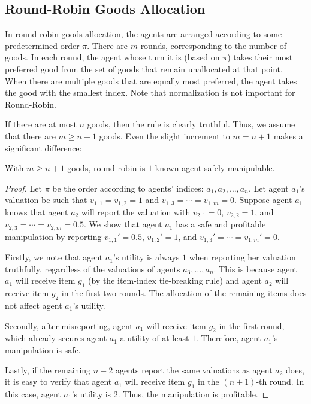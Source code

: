 \subsection{Round-Robin Goods Allocation}
In round-robin goods allocation, the agents are arranged according to some predetermined order $\pi$. 
There are $m$ rounds, corresponding to the number of goods. 
In each round, the agent whose turn it is (based on $\pi$) takes their most preferred good from the set of goods that remain unallocated at that point.
When there are multiple goods that are equally most preferred, the agent takes the good with the smallest index.
Note that normalization is not important for Round-Robin.

If there are at most $n$ goods, then the rule is clearly truthful.
Thus, we assume that there are $m\geq n+1$ goods.
Even the slight increment to $m=n+1$ makes a significant difference:

\begin{lemma}\label{claim:RR-RAT1-tie}
    With $m\geq n+1$ goods, round-robin  is $1$-known-agent safely-manipulable.
\end{lemma}

\begin{proof}
    Let $\pi$ be the order according to agents' indices: $a_1,a_2,\ldots,a_n$.
    Let agent $a_1$'s valuation be such that $v_{1,1}=v_{1,2}=1$ and $v_{1,3}=\cdots = v_{1,m}=0$.
    Suppose agent $a_1$ knows that agent $a_2$ will report the valuation with $v_{2,1}=0$, $v_{2,2}=1$, and $v_{2,3}=\cdots=v_{2,m}=0.5$.
    We show that agent $a_1$ has a safe and profitable manipulation by reporting $v_{1,1}'=0.5$, $v_{1,2}'=1$, and $v_{1,3}'=\cdots=v_{1,m}'=0$.

    Firstly, we note that agent $a_1$'s utility is always $1$ when reporting her valuation truthfully, regardless of the valuations of agents $a_3,\ldots,a_n$.
    This is because agent $a_1$ will receive item $g_1$ (by the item-index tie-breaking rule) and agent $a_2$ will receive item $g_2$ in the first two rounds.
    The allocation of the remaining items does not affect agent $a_1$'s utility.

    Secondly, after misreporting, agent $a_1$ will receive item $g_2$ in the first round, which already secures agent $a_1$ a utility of at least $1$. Therefore, agent $a_1$'s manipulation is safe.

    Lastly, if the remaining $n-2$ agents report the same valuations as agent $a_2$ does, it is easy to verify that agent $a_1$ will receive item $g_1$ in the $(n+1)$-th round.
    In this case, agent $a_1$'s utility is $2$.
    Thus, the manipulation is profitable.
\end{proof}

